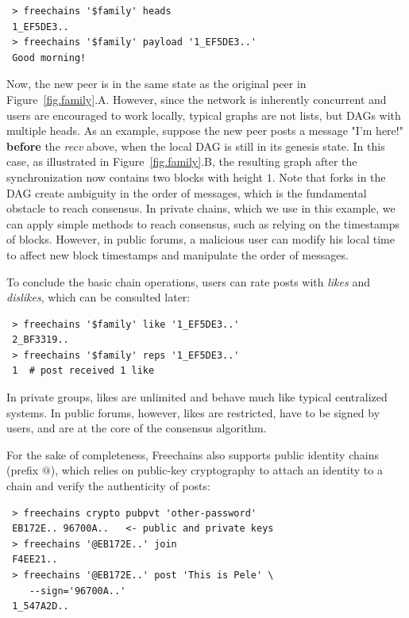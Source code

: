 \documentclass[10pt,journal,compsoc]{IEEEtran}
\newcommand{\FC}       {Freechains\xspace}
\begin{document}
{\footnotesize
\begin{verbatim}
 > freechains '$family' heads
 1_EF5DE3..
 > freechains '$family' payload '1_EF5DE3..'
 Good morning!
\end{verbatim}
}

Now, the new peer is in the same state as the original peer in
Figure~\ref{fig.family}.A.
However, since the network is inherently concurrent and users are encouraged to
work locally, typical graphs are not lists, but DAGs with multiple heads.
As an example, suppose the new peer posts a message "I'm here!" \textbf{before}
the \emph{recv} above, when the local DAG is still in its genesis state.
In this case, as illustrated in Figure~\ref{fig.family}.B, the resulting graph
after the synchronization now contains two blocks with height $1$.
%
Note that forks in the DAG create ambiguity in the order of messages, which is
the fundamental obstacle to reach consensus.
In private chains, which we use in this example, we can apply simple methods to
reach consensus, such as relying on the timestamps of blocks.
However, in public forums, a malicious user can modify his local time to affect
new block timestamps and manipulate the order of messages.

To conclude the basic chain operations, users can rate posts with \emph{likes}
and \emph{dislikes}, which can be consulted later:

{\footnotesize
\begin{verbatim}
 > freechains '$family' like '1_EF5DE3..'
 2_BF3319..
 > freechains '$family' reps '1_EF5DE3..'
 1  # post received 1 like
\end{verbatim}
}

In private groups, likes are unlimited and behave much like typical centralized
systems.
In public forums, however, likes are restricted, have to be signed by users,
and are at the core of the consensus algorithm.

For the sake of completeness, \FC also supports public identity chains (prefix
$@$), which relies on public-key cryptography to attach an identity to a chain
and verify the authenticity of posts:

{\footnotesize
\begin{verbatim}
 > freechains crypto pubpvt 'other-password'
 EB172E.. 96700A..   <- public and private keys
 > freechains '@EB172E..' join
 F4EE21..
 > freechains '@EB172E..' post 'This is Pele' \
    --sign='96700A..'
 1_547A2D..
\end{verbatim}
}
\end{document}
